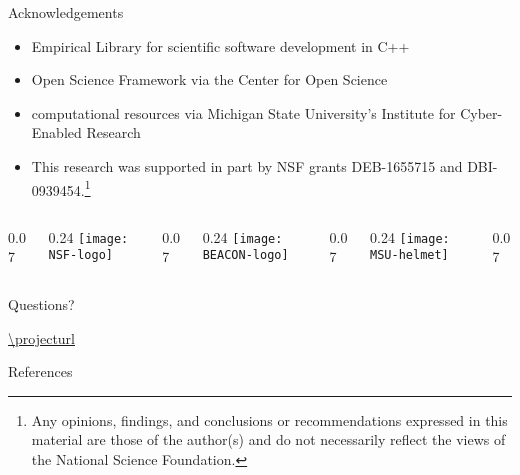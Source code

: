\begin{frame}{Acknowledgements}
\begin{itemize}
\item Empirical Library for scientific software development in C++
\item Open Science Framework via the Center for Open Science
\item computational resources via Michigan State University's Institute for Cyber-Enabled Research
\item This research was supported in part by NSF grants DEB-1655715 and DBI-0939454.\footnote[1]{Any opinions, findings, and conclusions or recommendations expressed in this material are those of the author(s) and do not necessarily reflect the views of the National Science Foundation.}
\end{itemize}

\vfill

\newcommand{\innerspacer}{0.07\textwidth}
\newcommand{\content}{0.24\textwidth}
\newcommand{\outerspacer}{0.07\textwidth}

\begin{center}
 \begin{columns}
	\begin{column}{\outerspacer}~\end{column}
	 \begin{column}{\content}
		\texttt{[image: NSF-logo]}
 	\end{column}
  \begin{column}{\innerspacer}~\end{column}
	 \begin{column}{\content}
		\texttt{[image: BEACON-logo]}
 	\end{column}
  \begin{column}{\innerspacer}~\end{column}
 	\begin{column}{\content}
   \texttt{[image: MSU-helmet]}
 	\end{column}
 	\begin{column}{\outerspacer}~\end{column}
 \end{columns}
\end{center}

\end{frame}


\begin{frame}[standout]
\vspace{17ex}

{\Huge
Questions?%
}
\vspace{15ex}

\begin{adjustbox}{width=0.5\textwidth,center}%
\url{\projecturl}%
\end{adjustbox}

\end{frame}

\begin{frame}[allowframebreaks]{References}

  
  
\end{frame}
